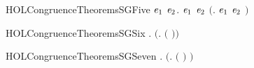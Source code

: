 \begin{SaveVerbatim}{HOLCongruenceTheoremsSGFive}
\HOLTokenTurnstile{} \HOLSymConst{\HOLTokenForall{}}\ensuremath{\HOLBoundVar{e}\sb{\mathrm{1}}} \ensuremath{\HOLBoundVar{e}\sb{\mathrm{2}}}.  \ensuremath{\HOLBoundVar{e}\sb{\mathrm{1}}} \HOLSymConst{\HOLTokenConj{}}  \ensuremath{\HOLBoundVar{e}\sb{\mathrm{2}}} \HOLSymConst{\HOLTokenImp{}}  \ensuremath{(}\HOLTokenLambda{}. \ensuremath{\HOLBoundVar{e}\sb{\mathrm{1}}}  \HOLSymConst{\ensuremath{\mid}} \ensuremath{\HOLBoundVar{e}\sb{\mathrm{2}}} \ensuremath{)}
\end{SaveVerbatim}
\newcommand{\HOLCongruenceTheoremsSGFive}{\UseVerbatim{HOLCongruenceTheoremsSGFive}}
\begin{SaveVerbatim}{HOLCongruenceTheoremsSGSix}
\HOLTokenTurnstile{} \HOLSymConst{\HOLTokenForall{}} .   \HOLSymConst{\HOLTokenImp{}}  \ensuremath{(}\HOLTokenLambda{}.   \ensuremath{(} \ensuremath{)}\ensuremath{)}
\end{SaveVerbatim}
\newcommand{\HOLCongruenceTheoremsSGSix}{\UseVerbatim{HOLCongruenceTheoremsSGSix}}
\begin{SaveVerbatim}{HOLCongruenceTheoremsSGSeven}
\HOLTokenTurnstile{} \HOLSymConst{\HOLTokenForall{}} .   \HOLSymConst{\HOLTokenImp{}}  \ensuremath{(}\HOLTokenLambda{}.  \ensuremath{(} \ensuremath{)} \ensuremath{)}
\end{SaveVerbatim}
\newcommand{\HOLCongruenceTheoremsSGSeven}{\UseVerbatim{HOLCongruenceTheoremsSGSeven}}
